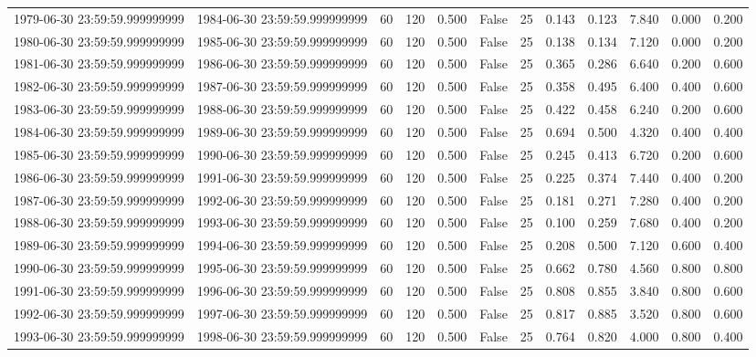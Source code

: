 \begin{table}
\begin{tabular}{lccccccccccc}
1979-06-30 23:59:59.999999999 & 1984-06-30 23:59:59.999999999 & 60 & 120 & 0.500 & False & 25 & 0.143 & 0.123 & 7.840 & 0.000 & 0.200 \\
1980-06-30 23:59:59.999999999 & 1985-06-30 23:59:59.999999999 & 60 & 120 & 0.500 & False & 25 & 0.138 & 0.134 & 7.120 & 0.000 & 0.200 \\
1981-06-30 23:59:59.999999999 & 1986-06-30 23:59:59.999999999 & 60 & 120 & 0.500 & False & 25 & 0.365 & 0.286 & 6.640 & 0.200 & 0.600 \\
1982-06-30 23:59:59.999999999 & 1987-06-30 23:59:59.999999999 & 60 & 120 & 0.500 & False & 25 & 0.358 & 0.495 & 6.400 & 0.400 & 0.600 \\
1983-06-30 23:59:59.999999999 & 1988-06-30 23:59:59.999999999 & 60 & 120 & 0.500 & False & 25 & 0.422 & 0.458 & 6.240 & 0.200 & 0.600 \\
1984-06-30 23:59:59.999999999 & 1989-06-30 23:59:59.999999999 & 60 & 120 & 0.500 & False & 25 & 0.694 & 0.500 & 4.320 & 0.400 & 0.400 \\
1985-06-30 23:59:59.999999999 & 1990-06-30 23:59:59.999999999 & 60 & 120 & 0.500 & False & 25 & 0.245 & 0.413 & 6.720 & 0.200 & 0.600 \\
1986-06-30 23:59:59.999999999 & 1991-06-30 23:59:59.999999999 & 60 & 120 & 0.500 & False & 25 & 0.225 & 0.374 & 7.440 & 0.400 & 0.200 \\
1987-06-30 23:59:59.999999999 & 1992-06-30 23:59:59.999999999 & 60 & 120 & 0.500 & False & 25 & 0.181 & 0.271 & 7.280 & 0.400 & 0.200 \\
1988-06-30 23:59:59.999999999 & 1993-06-30 23:59:59.999999999 & 60 & 120 & 0.500 & False & 25 & 0.100 & 0.259 & 7.680 & 0.400 & 0.200 \\
1989-06-30 23:59:59.999999999 & 1994-06-30 23:59:59.999999999 & 60 & 120 & 0.500 & False & 25 & 0.208 & 0.500 & 7.120 & 0.600 & 0.400 \\
1990-06-30 23:59:59.999999999 & 1995-06-30 23:59:59.999999999 & 60 & 120 & 0.500 & False & 25 & 0.662 & 0.780 & 4.560 & 0.800 & 0.800 \\
1991-06-30 23:59:59.999999999 & 1996-06-30 23:59:59.999999999 & 60 & 120 & 0.500 & False & 25 & 0.808 & 0.855 & 3.840 & 0.800 & 0.600 \\
1992-06-30 23:59:59.999999999 & 1997-06-30 23:59:59.999999999 & 60 & 120 & 0.500 & False & 25 & 0.817 & 0.885 & 3.520 & 0.800 & 0.600 \\
1993-06-30 23:59:59.999999999 & 1998-06-30 23:59:59.999999999 & 60 & 120 & 0.500 & False & 25 & 0.764 & 0.820 & 4.000 & 0.800 & 0.400 \\

\end{tabular}
\end{table}
